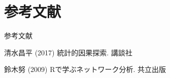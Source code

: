\documentclass[dvipdfmx]{beamer}
\begin{document}
\section{参考文献}

\begin{frame}{参考文献}

{\scriptsize
\begin{thebibliography}{99}
\beamertemplatetextbibitems

清水昌平 (2017) 統計的因果探索. 講談社

鈴木努 (2009) Rで学ぶネットワーク分析. 共立出版


\end{thebibliography}
}

\end{frame}
\end{document}
